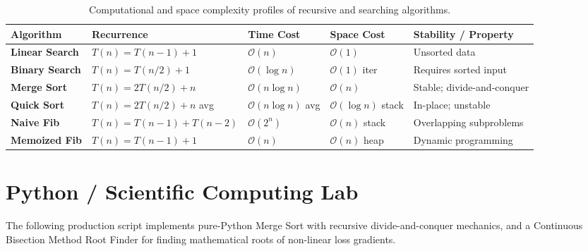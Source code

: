 \begin{table}[htbp]
\centering
\small
\begin{tabular}{p{2.8cm} p{2.6cm} p{2.2cm} p{2.2cm} p{3.4cm}}
\hline
\textbf{Algorithm} & \textbf{Recurrence} & \textbf{Time Cost} & \textbf{Space Cost} & \textbf{Stability / Property} \\
\hline
\textbf{Linear Search} & $T(n) = T(n-1) + 1$ & $\mathcal{O}(n)$ & $\mathcal{O}(1)$ & Unsorted data \\
\textbf{Binary Search} & $T(n) = T(n/2) + 1$ & $\mathcal{O}(\log n)$ & $\mathcal{O}(1)$ iter & Requires sorted input \\
\textbf{Merge Sort} & $T(n) = 2T(n/2) + n$ & $\mathcal{O}(n \log n)$ & $\mathcal{O}(n)$ & Stable; divide-and-conquer \\
\textbf{Quick Sort} & $T(n) = 2T(n/2) + n$ avg & $\mathcal{O}(n \log n)$ avg & $\mathcal{O}(\log n)$ stack & In-place; unstable \\
\textbf{Naive Fib} & $T(n) = T(n-1)+T(n-2)$ & $\mathcal{O}(2^n)$ & $\mathcal{O}(n)$ stack & Overlapping subproblems \\
\textbf{Memoized Fib} & $T(n) = T(n-1) + 1$ & $\mathcal{O}(n)$ & $\mathcal{O}(n)$ heap & Dynamic programming \\
\hline
\end{tabular}
\caption{Computational and space complexity profiles of recursive and searching algorithms.}
\label{tab:recursion_taxonomy}
\end{table}

\section{Python / Scientific Computing Lab}

The following production script implements pure-Python Merge Sort with recursive divide-and-conquer mechanics, and a Continuous Bisection Method Root Finder for finding mathematical roots of non-linear loss gradients.

